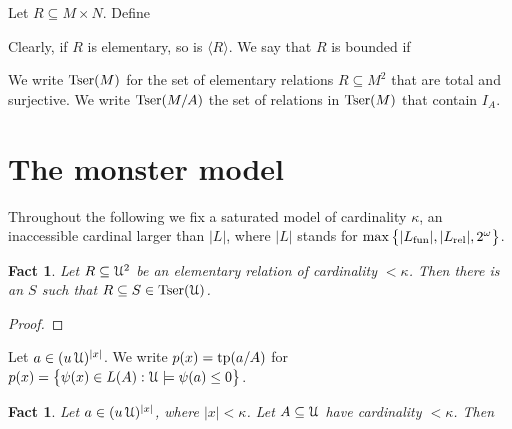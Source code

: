 \documentclass[12pt,letterpaper,oneside,reqno]{amsart}
\theoremstyle{plain}
\newtheorem{fact}[theorem]{Fact}
\theoremstyle{remark}
\renewcommand*{\emph}[1]{%
   \smash{\tikz[baseline]\node[rectangle, fill=olive!25, rounded corners, inner xsep=0.5ex, inner ysep=0.2ex, anchor=base, minimum height = 2.7ex]{#1};}}
\begin{document}
Let $R\subseteq M\times N$.
Define


Clearly, if $R$ is elementary, so is $\langle R\rangle$.
We say that $R$ is bounded if


We write ${\rm Tser}(M)$ for the set of elementary relations $R\subseteq M^2$ that are total and surjective.
We write  ${\rm Tser}(M/A)$ the set of relations in ${\rm Tser}(M)$ that contain $I_A$.









\section{The monster model}

Throughout the following we fix a saturated model \emph{$\EuScript U$\/} of cardinality $\kappa$, an inaccessible cardinal larger than $|L|$, where $|L|$ stands for $\max\big\{|L_{\rm fun}|,|L_{\rm rel}|,2^\omega\big\}$.

\begin{fact}
  Let $R\subseteq{\EuScript U}^2$ be an elementary relation of cardinality $<\kappa$.
  Then there is an  $S$ such that $R\subseteq S\in{\rm Tser}({\EuScript U})$.
\end{fact}

\begin{proof}
  
\end{proof}

Let $a\in(u\,{\EuScript U})^{|x|}$. 
We write $p(x)={\rm tp}(a/A)$ for $p(x)=\big\{\psi(x)\in L(A):{\EuScript U}\models \psi(a)\le0\big\}$.


\begin{fact}
  Let $a\in(u\,{\EuScript U})^{|x|}$, where $|x|<\kappa$.
  Let $A\subseteq{\EuScript U}$ have cardinality $<\kappa$.
  Then

\end{fact}
\end{document}
